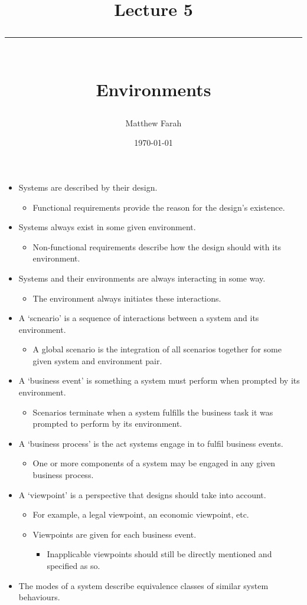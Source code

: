 \documentclass{article}
\date{
	\vspace{-.75em}
	{\large \today}
}
\title{
	\vspace*{-1.5em}
	{\Huge Lecture 5} \\
	\vspace{-1em}
	\rule{\textwidth/4}{.01em} \\
	\vspace{-.25em}
	{\Large Environments}
	\vspace{-.75em}
}
\author{
	{\large Matthew Farah}
}
\begin{document}
\maketitle
\pagestyle{fancy}

\fi

\begin{itemize}
	\item Systems are described by their design.
	\begin{itemize}
		\item Functional requirements provide the reason for the design's existence.
	\end{itemize}
	\item Systems always exist in some given environment.
	\begin{itemize}
		\item Non-functional requirements describe how the design should with its environment.
	\end{itemize}
	\item Systems and their environments are always interacting in some way.
	\begin{itemize}
		\item The environment always initiates these interactions.
	\end{itemize}
	\item A `scneario' is a sequence of interactions between a system and its environment.
	\begin{itemize}
		\item A global scenario is the integration of all scenarios together for some given system and environment pair.
	\end{itemize}
	\item A `business event' is something a system must perform when prompted by its environment.
	\begin{itemize}
		\item Scenarios terminate when a system fulfills the business task it was prompted to perform by its environment.
	\end{itemize}
	\item A `business process' is the act systems engage in to fulfil business events.
	\begin{itemize}
		\item One or more components of a system may be engaged in any given business process.
	\end{itemize}
	\item A `viewpoint' is a perspective that designs should take into account.
	\begin{itemize}
		\item For example, a legal viewpoint, an economic viewpoint, etc.
		\item Viewpoints are given for each business event.
		\begin{itemize}
			\item Inapplicable viewpoints should still be directly mentioned and specified as so.
		\end{itemize}
	\end{itemize}
	\item The modes of a system describe equivalence classes of similar system behaviours.
\end{itemize}

\ifdefined\iscombined
	\newpage
\else
	
\end{document}
